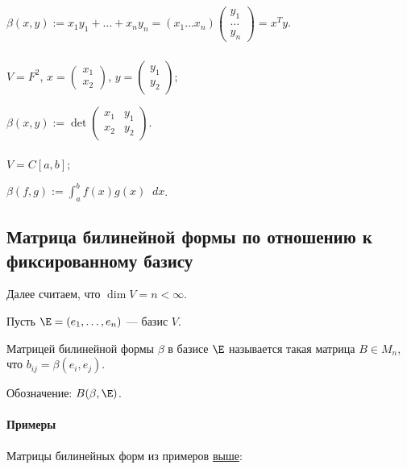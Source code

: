 $\beta(x, y) := x_1 y_1 + \dots + x_n y_n = (x_1 \dots x_n) \begin{pmatrix} y_1 \\ \dots \\ y_n \end{pmatrix} = x^{T} y$.

\subsubsection{}

$V = F^2$, $x = \begin{pmatrix} x_1 \\ x_2 \end{pmatrix}$, $y = \begin{pmatrix} y_1 \\ y_2 \end{pmatrix}$;

$\beta(x, y) := \det \begin{pmatrix} x_1 & y_1 \\ x_2 & y_2 \end{pmatrix}$.

\subsubsection{}

$V = C[a, b];$

$\beta(f, g) := \displaystyle\int^b_a f(x) g(x) \mathop{}\!d x$.


\subsection{Матрица билинейной формы по отношению к фиксированному базису}

Далее считаем, что $\dim V = n < \infty$.

Пусть $\E = (e_1, \dots, e_n)$ --- базис $V$.

\begin{definition}
    Матрицей билинейной формы $\beta$ в базисе $\E$ называется такая матрица $B \in M_n$, что $b_{ij} = \beta(e_i, e_j)$.

    Обозначение: $B(\beta, \E)$.
\end{definition}

\paragraph{Примеры}
Матрицы билинейных форм из примеров \hyperref[lec19:bilinear_examples]{выше}:

